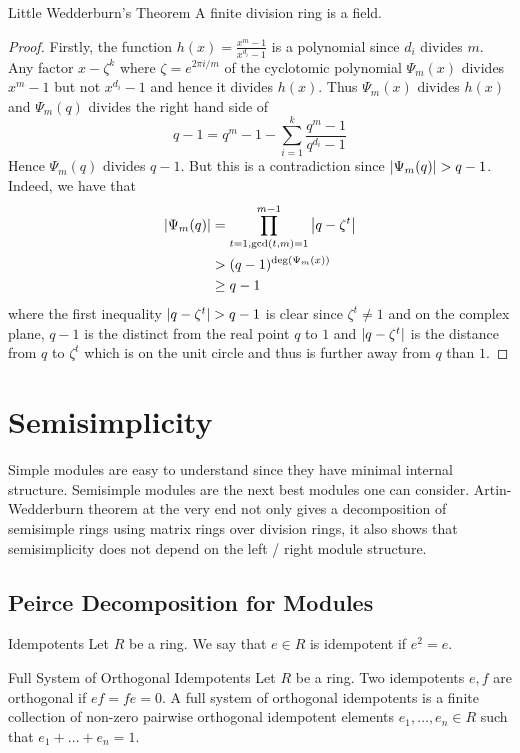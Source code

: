 \documentclass[a4paper]{article}
\begin{document}
\begin{thm}{Little Wedderburn's Theorem}{} A finite division ring is a field. \tcbline
\begin{proof}
Firstly, the function $h(x)=\frac{x^m-1}{x^{d_i}-1}$ is a polynomial since $d_i$ divides $m$. Any factor $x-\zeta^k$ where $\zeta=e^{2\pi i/m}$ of the cyclotomic polynomial $\Psi_m(x)$ divides $x^m-1$ but not $x^{d_i}-1$ and hence it divides $h(x)$. Thus $\Psi_m(x)$ divides $h(x)$ and $\Psi_m(q)$ divides the right hand side of $$q-1=q^m-1-\sum_{i=1}^k\frac{q^m-1}{q^{d_i}-1}$$ Hence $\Psi_m(q)$ divides $q-1$. But this is a contradiction since $\abs{\Psi_m(q)}>q-1$. Indeed, we have that 
\begin{align*}
\abs{\Psi_m(q)}&=\prod_{t=1,\gcd(t,m)=1}^{m-1}\abs{q-\zeta^t}\\
&>(q-1)^{\deg(\Psi_m(x))}\\
&\geq q-1
\end{align*}
where the first inequality $\abs{q-\zeta^t}>q-1$ is clear since $\zeta^t\neq 1$ and on the complex plane, $q-1$ is the distinct from the real point $q$ to $1$ and $\abs{q-\zeta^t}$ is the distance from $q$ to $\zeta^t$ which is on the unit circle and thus is further away from $q$ than $1$. 
\end{proof}
\end{thm}

\pagebreak
\section{Semisimplicity}
Simple modules are easy to understand since they have minimal internal structure. Semisimple modules are the next best modules one can consider. Artin-Wedderburn theorem at the very end not only gives a decomposition of semisimple rings using matrix rings over division rings, it also shows that semisimplicity does not depend on the left / right module structure. 


\subsection{Peirce Decomposition for Modules}
\begin{defn}{Idempotents}{} Let $R$ be a ring. We say that $e\in R$ is idempotent if $e^2=e$. 
\end{defn}

\begin{defn}{Full System of Orthogonal Idempotents}{} Let $R$ be a ring. Two idempotents $e,f$ are orthogonal if $ef=fe=0$. A full system of orthogonal idempotents is a finite collection of non-zero pairwise orthogonal idempotent elements $e_1,\dots,e_n\in R$ such that $e_1+\dots+e_n=1$. 
\end{defn}
\end{document}
